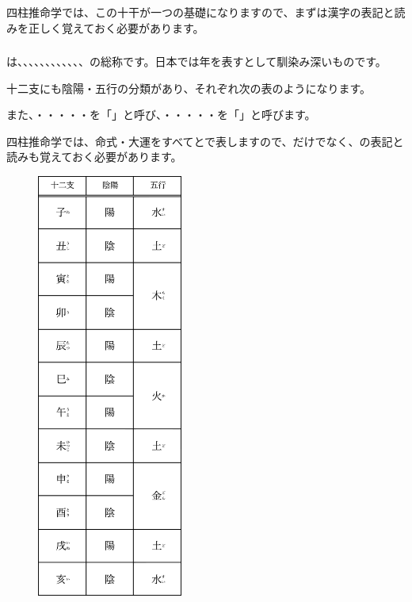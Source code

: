 \documentclass[a5paper,11pt,dvipdfmx]{tarticle}
\begin{document}
四柱推命学では、この十干が一つの基礎になりますので、まずは漢字の表記と読みを正しく覚えておく必要があります。

\subsubsection*{}

は、、、、、、、、、、、、の総称です。日本では年を表すとして馴染み深いものです。

十二支にも陰陽・五行の分類があり、それぞれ次の表のようになります。

また、・・・・・を「」と呼び、・・・・・を「」と呼びます。

四柱推命学では、命式・大運をすべてとで表しますので、だけでなく、の表記と読みも覚えておく必要があります。

\begin{figure}[h]
  \centering
  \includegraphics[width=48mm,angle=90]{figs/table2-2.eps}
\end{figure}
\end{document}
